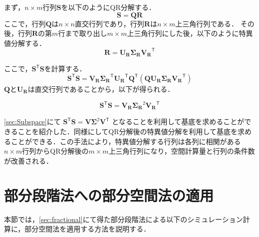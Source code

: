 \documentclass[a4j,12pt]{jreport}
\begin{document}
まず，$n \times m$行列$\bm{S}$を以下のようにQR分解する．
\[
	\bm{S} = \bm{Q}\bm{R}
\]
ここで，行列$\bm{Q}$は$n \times n$直交行列であり，行列$\bm{R}$は$n \times m$上三角行列である．
その後，行列$\bm{R}$の第$m$行まで取り出し$m\times m$上三角行列にした後，以下のように特異値分解する．
\[
\bm{R} = \bm{U_R} \bm{\Sigma_R} \bm{V_R}^{\mathsf T}
\]

ここで，$\bm{S}^{\mathsf T}\bm{S}$を計算する．
\[
	\bm{S}^{\mathsf T}\bm{S} =  \bm{V_R}  \bm{\Sigma_R}^{\mathsf T} \bm{U_R}^{\mathsf T}\bm{Q}^{\mathsf T} (\bm{Q}\bm{U_R} \bm{\Sigma_R} \bm{V_R}^{\mathsf T})
\]
$\bm{Q}と\bm{U_R}$は直交行列であることから，以下が得られる．

\[
\bm{S}^{\mathsf T}\bm{S} = \bm{V_R}\bm{\Sigma_R}^2 \bm{V_R}^{\mathsf T}
\]

\ref{sec:Subspace}にて
$\bm{S}^{\mathsf T}\bm{S} = \bm{V}\bm{\Sigma}^2 \bm{V}^{\mathsf T}$
となることを利用して基底を求めることができることを紹介した．同様にしてQR分解後の特異値分解を利用して基底を求めることができる．この手法により，特異値分解する行列は各列に相関がある$n \times m$行列からQR分解後の$m \times m$上三角行列になり，空間計算量と行列の条件数が改善される．

\section{部分段階法への部分空間法の適用}
本節では，\ref{sec:fractional}にて得た部分段階法による以下のシミュレーション計算に，部分空間法を適用する方法を説明する．

\end{document}
